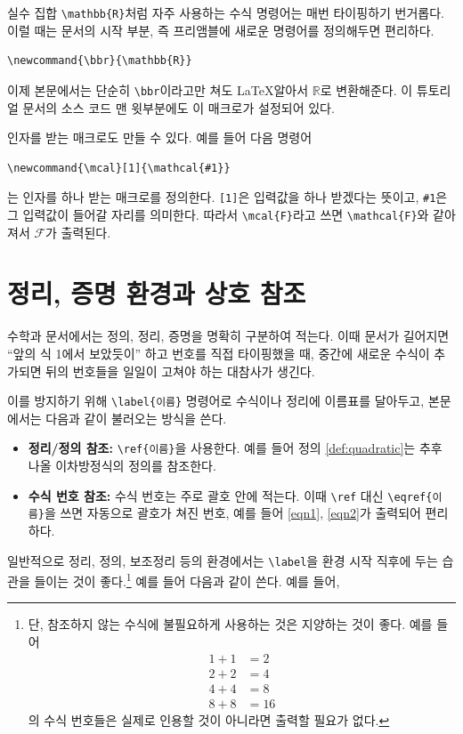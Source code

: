 \documentclass[11pt, a4paper]{article}
\newcommand{\bbr}{\mathbb{R}} %
\newcommand{\mcal}[1]{\mathcal{#1}} %
\theoremstyle{plain}
\theoremstyle{definition}
\theoremstyle{remark}
\begin{document}
실수 집합 \verb|\mathbb{R}|처럼 자주 사용하는 수식 명령어는 매번 타이핑하기 번거롭다. 이럴 때는 문서의 시작 부분, 즉 프리앰블에 새로운 명령어를 정의해두면 편리하다.

\begin{verbatim}
\newcommand{\bbr}{\mathbb{R}}
\end{verbatim}

이제 본문에서는 단순히 \verb|\bbr|이라고만 쳐도 \LaTeX\이 알아서 $\mathbb{R}$로 변환해준다. 이 튜토리얼 문서의 소스 코드 맨 윗부분에도 이 매크로가 설정되어 있다.

인자를 받는 매크로도 만들 수 있다.
예를 들어 다음 명령어

\begin{verbatim}
\newcommand{\mcal}[1]{\mathcal{#1}}
\end{verbatim}

는 인자를 하나 받는 매크로를 정의한다. \verb|[1]|은 입력값을 하나 받겠다는 뜻이고, \verb|#1|은 그 입력값이 들어갈 자리를 의미한다.
따라서 \verb|\mcal{F}|라고 쓰면 \verb|\mathcal{F}|와 같아져서 $\mathcal{F}$가 출력된다.

\section{정리, 증명 환경과 상호 참조}\label{Referencing}

수학과 문서에서는 정의, 정리, 증명을 명확히 구분하여 적는다. 이때 문서가 길어지면 ``앞의 식 1에서 보았듯이'' 하고 번호를 직접 타이핑했을 때, 중간에 새로운 수식이 추가되면 뒤의 번호들을 일일이 고쳐야 하는 대참사가 생긴다.

이를 방지하기 위해 \verb|\label{이름}| 명령어로 수식이나 정리에 이름표를 달아두고, 본문에서는 다음과 같이 불러오는 방식을 쓴다.

\begin{itemize}
    \item \textbf{정리/정의 참조:}
    \verb|\ref{이름}|을 사용한다. 예를 들어 정의 \ref{def:quadratic}는 추후 나올 이차방정식의 정의를 참조한다.

    \item \textbf{수식 번호 참조:}
    수식 번호는 주로 괄호 안에 적는다.
    이때 \verb|\ref| 대신 \verb|\eqref{이름}|을 쓰면
    자동으로 괄호가 쳐진 번호, 예를 들어 \eqref{eqn1}, \eqref{eqn2}가 출력되어 편리하다.
\end{itemize}

일반적으로 정리, 정의, 보조정리 등의 환경에서는 \verb|\label|을 환경 시작 직후에 두는 습관을 들이는 것이 좋다.\footnote{단, 참조하지 않는 수식에 불필요하게 사용하는 것은 지양하는 것이 좋다. 예를 들어
\begin{align}
	1+1&=2 \\
	2+2&=4 \\
	4+4&=8 \\
	8+8&=16
\end{align}
의 수식 번호들은 실제로 인용할 것이 아니라면 출력할 필요가 없다.
} 예를 들어 다음과 같이 쓴다. 예를 들어,
\end{document}
